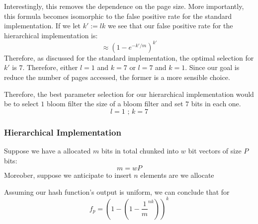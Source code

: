 Interestingly, this removes the dependence on the page size.
More importantly, this formula becomes isomorphic to the false positive rate for the standard implementation.
If we let $k' := lk$ we see that our false positive rate for the hierarchical implementation is:
$$\approx (1 - e^{-k'/m})^{k'}$$
Therefore, as discussed for the standard implementation, the optimal selection for $k'$ is $7$.
Therefore, either $l=1$ and $k=7$ or $l=7$ and $k=1$.
Since our goal is reduce the number of pages accessed, the former is a more sensible choice.

Therefore, the best parameter selection for our hierarchical implementation would be to select $1$ bloom filter the size of a bloom filter and set $7$ bits in each one.
$$l = 1\text{ ; } k = 7$$







\subsubsection{Hierarchical Implementation}

Suppose we have a allocated $m$ bits in total chunked into $w$ bit vectors of size $P$ bits:
$$ m = wP$$
Moreober, suppose we anticipate to insert $n$ elements are we allocate


Assuming our hash function's output is uniform, we can conclude that for
\begin{equation}
    f_p = (1 - (1 - \frac{1}{m}^{nk}))^k
\end{equation}